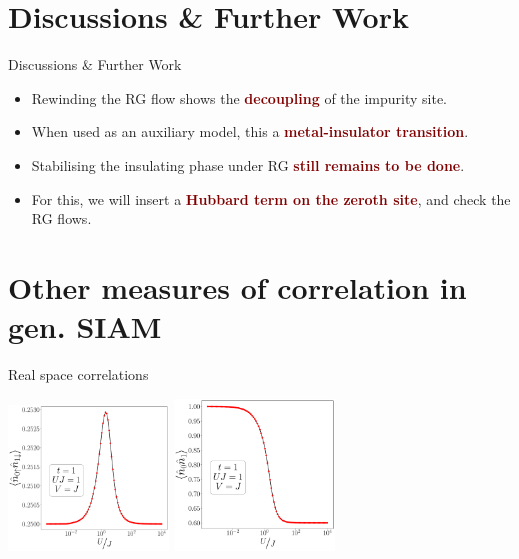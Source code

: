 \documentclass[aspectratio=169]{beamer}
\newcommand{\focus}[1]{\textcolor{maroon}{\textbf{#1}}}
\begin{document}
\section{Discussions \& Further Work}
\begin{frame}[noframenumbering]{Discussions \& Further Work}
	\begin{itemize}[<+-|alert@+>]
		\item Rewinding the RG flow shows the \focus{decoupling} of the impurity site.
 		\item When used as an auxiliary model, this a \focus{metal-insulator transition}.
 		\item Stabilising the insulating phase under RG \focus{still remains to be done}.
 		\item For this, we will insert a \focus{Hubbard term on the zeroth site}, and check the RG flows.
	\end{itemize}
\end{frame}

\section{Other measures of correlation in gen. SIAM}

\begin{frame}[noframenumbering]{Real space correlations}

\begin{center}
\includegraphics[width=0.32\textwidth]{figures/r-opp-t=1.000,J=1_over_U,V=J,N=4,U=0.016,100.000,95.pdf}
\includegraphics[width=0.32\textwidth]{figures/r-charge-t=1.000,J=1_over_U,V=J,N=4,U=0.016,100.000,95.pdf}
\end{center}

\end{frame}
\end{document}
